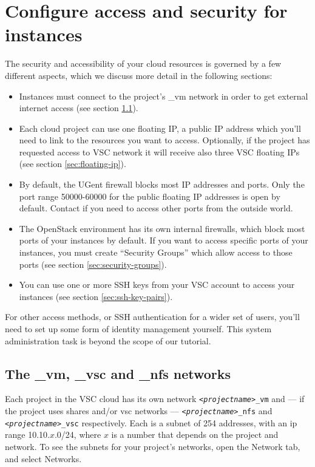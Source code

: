 \chapter{Configure access and security for instances}\label{cha:conf-access-secur}
The security and accessibility of your cloud resources is governed by
a few different aspects, which we discuss more detail in the following
sections:
\begin{itemize}
\item Instances must connect to the project's \_vm network in order to
  get external internet access (see section \ref{sec:_vm-_nfs-networks}).
\item Each cloud project can use one floating IP, a public IP address
  which you'll need to link to the resources you want to access. Optionally,
  if the project has requested access to VSC network it will receive also
  three VSC floating IPs (see section \ref{sec:floating-ip}).
\item By default, the UGent firewall blocks most IP addresses and
  ports.  Only the port range 50000-60000 for the public floating IP
  addresses is open by default.
  Contact \cloudinfo if you need to access other ports from the
  outside world.
\item The OpenStack environment has its own internal firewalls, which
  block most ports of your instances by default.  If you want to
  access specific ports of your instances, you must create ``Security
  Groups'' which allow access to those ports (see section
  \ref{sec:security-groups}).
\item You can use one or more SSH keys from your VSC account to access
  your instances (see section \ref{sec:ssh-key-pairs}).
\end{itemize}
For other access methods, or SSH authentication for a wider set of
users, you'll need to set up some form of identity management
yourself.  This system administration task is beyond the scope of our
tutorial.

\section{The \_vm, \_vsc and \_nfs networks}\label{sec:_vm-_nfs-networks}
Each project in the VSC cloud has its own network
\texttt{\emph{<projectname>}\_vm} and --- if the project uses shares
and/or vsc networks --- \texttt{\emph{<projectname>}\_nfs} and 
\texttt{\emph{<projectname>}\_vsc} respectively. Each is a subnet of 254
addresses, with an ip range 10.10.$x$.0/24, where $x$ is a number that
depends on the project and network.  To see the subnets for your
project's networks, open the Network tab, and select Networks.

